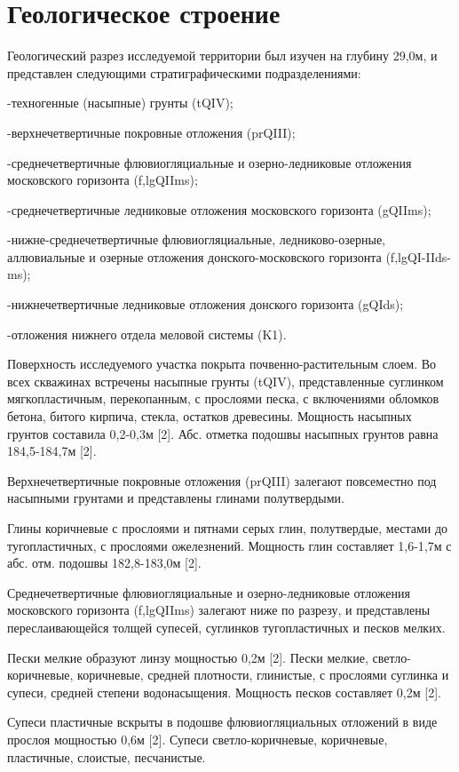 \chapter*{Геологическое строение} 

Геологический разрез исследуемой территории был изучен на глубину 29,0м, и представлен следующими стратиграфическими подразделениями:

-техногенные (насыпные) грунты (tQIV);

-верхнечетвертичные покровные отложения (prQIII);

-среднечетвертичные флювиогляциальные и озерно-ледниковые отложения московского горизонта (f,lgQIIms);

-среднечетвертичные ледниковые отложения московского горизонта (gQIIms);

-нижне-среднечетвертичные флювиогляциальные, ледниково-озерные, аллювиальные и озерные отложения донского-московского горизонта (f,lgQI-IIds-ms);

-нижнечетвертичные ледниковые отложения донского горизонта (gQIds);

-отложения нижнего отдела меловой системы (K1).

Поверхность исследуемого участка покрыта почвенно-растительным слоем. Во всех скважинах встречены насыпные грунты (tQIV), представленные суглинком мягкопластичным, перекопанным, с прослоями песка, с включениями обломков бетона, битого кирпича, стекла, остатков древесины. Мощность насыпных грунтов составила 0,2-0,3м [2]. Абс. отметка подошвы насыпных грунтов равна 184,5-184,7м [2].

Верхнечетвертичные покровные отложения (prQIII) залегают повсеместно под насыпными грунтами и представлены глинами полутвердыми.

Глины коричневые с прослоями и пятнами серых глин, полутвердые, местами до тугопластичных, с прослоями ожелезнений. Мощность глин составляет 1,6-1,7м с абс. отм. подошвы 182,8-183,0м [2].

Среднечетвертичные флювиогляциальные и озерно-ледниковые отложения московского горизонта (f,lgQIIms) залегают ниже по разрезу, и представлены переслаивающейся толщей супесей, суглинков тугопластичных и песков мелких.

Пески мелкие образуют линзу мощностью 0,2м [2]. Пески мелкие, светло-коричневые, коричневые, средней плотности, глинистые, с прослоями суглинка и супеси, средней степени водонасыщения. Мощность песков составляет 0,2м [2].

Супеси пластичные вскрыты в подошве флювиогляциальных отложений в виде прослоя мощностью 0,6м [2]. Супеси светло-коричневые, коричневые, пластичные, слоистые, песчанистые.

